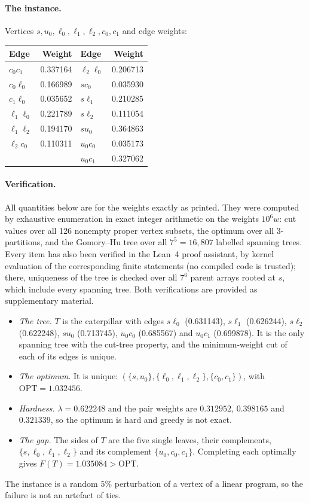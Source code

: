 \documentclass[preprint,12pt]{elsarticle}
\theoremstyle{definition}
\newcommand{\OPT}{\mathrm{OPT}}
\begin{document}
\paragraph{The instance.}
Vertices $s,u_0,\ell_0,\ell_1,\ell_2,c_0,c_1$ and edge weights:
\begin{center}
\begin{tabular}{lr@{\qquad}lr}
\toprule
Edge & Weight & Edge & Weight\\
\midrule
$c_0c_1$ & 0.337164 & $\ell_2\ell_0$ & 0.206713\\
$c_0\ell_0$ & 0.166989 & $sc_0$ & 0.035930\\
$c_1\ell_0$ & 0.035652 & $s\ell_1$ & 0.210285\\
$\ell_1\ell_0$ & 0.221789 & $s\ell_2$ & 0.111054\\
$\ell_1\ell_2$ & 0.194170 & $su_0$ & 0.364863\\
$\ell_2c_0$ & 0.110311 & $u_0c_0$ & 0.035173\\
 & & $u_0c_1$ & 0.327062\\
\bottomrule
\end{tabular}
\end{center}

\paragraph{Verification.}
All quantities below are for the weights exactly as printed. They were computed by exhaustive
enumeration in exact integer arithmetic on the weights $10^6w$: cut values over all 126 nonempty
proper vertex subsets, the optimum over all 3-partitions, and the Gomory--Hu tree over all
$7^5=16{,}807$ labelled spanning trees. Every item has also been verified in the Lean~4 proof
assistant, by kernel evaluation of the corresponding finite statements (no compiled code is trusted);
there, uniqueness of the tree is checked over all $7^6$ parent arrays rooted at $s$, which include
every spanning tree. Both verifications are provided as supplementary material.
\begin{itemize}[leftmargin=*]
\item \emph{The tree.} $T$ is the caterpillar with edges $s\ell_0$ (0.631143), $s\ell_1$ (0.626244),
  $s\ell_2$ (0.622248), $su_0$ (0.713745), $u_0c_0$ (0.685567) and $u_0c_1$ (0.699878). It is the only
  spanning tree with the cut-tree property, and the minimum-weight cut of each of its edges is unique.
\item \emph{The optimum.} It is unique: $(\{s,u_0\},\{\ell_0,\ell_1,\ell_2\},\{c_0,c_1\})$, with
  $\OPT=1.032456$.
\item \emph{Hardness.} $\lambda=0.622248$ and the pair weights are $0.312952$, $0.398165$ and
  $0.321339$, so the optimum is hard and greedy is not exact.
\item \emph{The gap.} The sides of $T$ are the five single leaves, their complements,
  $\{s,\ell_0,\ell_1,\ell_2\}$ and its complement $\{u_0,c_0,c_1\}$. Completing each optimally gives
  $F(T)=1.035084>\OPT$.
\end{itemize}
The instance is a random $5\%$ perturbation of a vertex of a linear program, so the failure is not an
artefact of ties.
\end{document}

